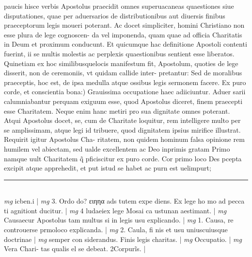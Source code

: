 \documentclass{article}
\begin{document}
\begin{pages}
paucis hisce verbis Apostolus praecidit omnes superuacaneas quaestiones siue disputationes, quae per aduersarios de distributionibus aut diuersis finibus praeceptorum legis moueri poterant. Ac docet simpliciter, homini Christiano non esse plura de lege cognoscen- da vel imponenda, quam quae ad officia Charitatis in Deum et proximum conducunt. Et quicumque  hac definitione Apostoli contenti fuerint, ii se multis molestis ac perplexis quaestionibus sentient esse liberatos. Quinetiam ex hoc similibusquelocis manifestum fit, Apostolum, quoties de lege disserit, non de ceremoniis, vt quidam callide inter- pretantur: Sed de moralibus praeceptis, hoc est, de ipsa medulla atque ossibus legis sermonem facere.  \pend\pstart Ex puro corde, et conscientia bona:) Grauissima occupatione haec adiiciuntur. Aduer sarii calumniabantur perquam exiguum esse, quod Apostolus diceret, finem praecepti esse Charitatem. Neque  enim hanc metiri pro sua dignitate omnes poterant. Atqui Apostolus docet, se, cum de Charitate loquitur, rem intelligere multo per se amplissimam, atque  legi id tribuere, quod dignitatem ipsius mirifice illustrat. Requirit igitur Apostolus Cha- ritatem, non quidem hominum falsa opinione rem humilem vel abiectam, sed ualde excellentem ac Deo inprimis gratam Primo namque  uult Charitatem q̃ pficiscitur ex puro corde. Cor primo loco Des pcepta excipit atque  apprehedit, et put istud se habet ac purn est uelimpurt;  \pend
\vspace{0.5cm}\noindent
\vspace{0.2cm}\rule{1cm}{0.2pt}\\ 
\hspace{0.2cm}\textit{mg}
\footnotesize icben.i 
\normalsize| 
\hspace{0.2cm}\textit{mg}
\footnotesize 3. Ordo do? ειηηα ads tutem expe diens. Ex lege ho mo ad pecca ti agnitiont ducitur. 
\normalsize| 
\hspace{0.2cm}\textit{mg}
\footnotesize 4 ludaeiex lege Mosai ca ustunan aestimant. 
\normalsize| 
\hspace{0.2cm}\textit{mg}
\footnotesize Causaecur Apostolus tam multus si in legis usu explicando. 
\normalsize| 
\hspace{0.2cm}\textit{mg}
\footnotesize 1. Causa, re controuerse prmoloco explicanda. 
\normalsize| 
\hspace{0.2cm}\textit{mg}
\footnotesize 2. Caula, fi nis et usu uniuscuiusque  doctrinae 
\normalsize| 
\hspace{0.2cm}\textit{mg}
\footnotesize semper con siderandus. Finis legis charitas. 
\normalsize| 
\hspace{0.2cm}\textit{mg}
\footnotesize Occupatio. 
\normalsize| 
\hspace{0.2cm}\textit{mg}
\footnotesize Vera Chari- tas qualis el se debeat. 2Corpurĩs. 
\normalsize| 

\end{pages}
\end{document}
